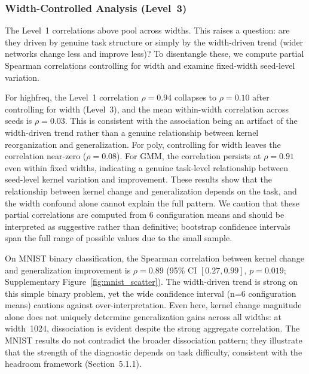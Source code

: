 \documentclass[twoside,11pt]{article}
\begin{document}
\subsubsection{Width-Controlled Analysis (Level~3)}

The Level~1 correlations above pool across widths. This raises a question: are they driven by genuine task structure or simply by the width-driven trend (wider networks change less and improve less)? To disentangle these, we compute partial Spearman correlations controlling for width and examine fixed-width seed-level variation.

For highfreq, the Level~1 correlation $\rho=0.94$ collapses to $\rho=0.10$ after controlling for width (Level~3), and the mean within-width correlation across seeds is $\rho=0.03$. This is consistent with the association being an artifact of the width-driven trend rather than a genuine relationship between kernel reorganization and generalization. For poly, controlling for width leaves the correlation near-zero ($\rho=0.08$). For GMM, the correlation persists at $\rho=0.91$ even within fixed widths, indicating a genuine task-level relationship between seed-level kernel variation and improvement. These results show that the relationship between kernel change and generalization depends on the task, and the width confound alone cannot explain the full pattern. We caution that these partial correlations are computed from 6 configuration means and should be interpreted as suggestive rather than definitive; bootstrap confidence intervals span the full range of possible values due to the small sample.

On MNIST binary classification, the Spearman correlation between kernel change and generalization improvement is $\rho=0.89$ (95\% CI $[0.27, 0.99]$, $p=0.019$; Supplementary Figure~\ref{fig:mnist_scatter}). The width-driven trend is strong on this simple binary problem, yet the wide confidence interval (n=6 configuration means) cautions against over-interpretation. Even here, kernel change magnitude alone does not uniquely determine generalization gains across all widths: at width~1024, dissociation is evident despite the strong aggregate correlation. The MNIST results do not contradict the broader dissociation pattern; they illustrate that the strength of the diagnostic depends on task difficulty, consistent with the headroom framework (Section~5.1.1).
\end{document}
